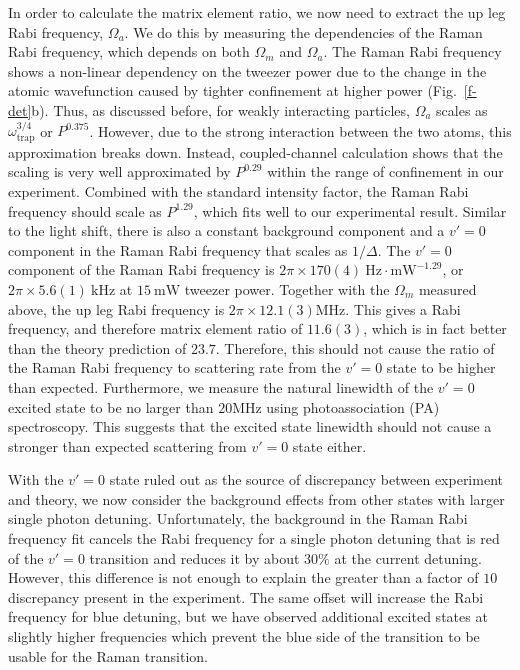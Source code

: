 \documentclass[aps,prl,twocolumn,superscriptaddress]{revtex4-1}
\begin{document}
In order to calculate the matrix element ratio,
we now need to extract the up leg Rabi frequency, $ \Omega_a $.
We do this by measuring the dependencies of the Raman Rabi frequency,
which depends on both $\Omega_m$ and $\Omega_a$.
The Raman Rabi frequency shows a non-linear dependency on the tweezer power
due to the change in the atomic wavefunction caused by
tighter confinement at higher power (Fig.~\ref{f-det}b).
Thus, as discussed before, for weakly interacting particles,
$\Omega_a$ scales as $ \omega_{\text{trap}}^{3/4}$ or $P^{0.375}$.
However, due to the strong interaction between the two atoms, this approximation breaks down.
Instead, coupled-channel calculation shows that the scaling
is very well approximated by $P^{0.29}$ within the range of confinement in our experiment.
Combined with the standard intensity factor, the Raman Rabi frequency should scale as $P^{1.29}$,
which fits well to our experimental result.
Similar to the light shift, there is also a constant background component
and a $v'=0$ component in the Raman Rabi frequency that scales as $1/\Delta$.
The $v'=0$ component of the Raman Rabi frequency is
$2\pi\times170(4) ~\mathrm{Hz\cdot mW^{-1.29}}$,
or $2\pi \times 5.6(1)~\mathrm{kHz}$ at $15 ~\mathrm{mW}$ tweezer power.
Together with the $\Omega_m$ measured above, the up leg Rabi frequency is
$2\pi \times 12.1(3)\mathrm{MHz}$.
This gives a Rabi frequency, and therefore matrix element ratio of $11.6(3)$,
which is in fact better than the theory prediction of $23.7$.
Therefore, this should not cause the ratio of the Raman Rabi frequency to scattering rate
from the $v'=0$ state to be higher than expected.
Furthermore, we measure the natural linewidth of the $v'=0$ excited state to be no larger than $20 \mathrm{MHz}$ using photoassociation (PA) spectroscopy.
This suggests that the excited state linewidth should not cause
a stronger than expected scattering from $v'=0$ state either.

With the $ v' = 0 $ state ruled out as the source of discrepancy between experiment and theory,
we now consider the background effects from other states with larger single photon detuning.
Unfortunately, the background in the Raman Rabi frequency fit cancels the Rabi frequency
for a single photon detuning that is red of the $v' = 0$ transition
and reduces it by about $30\%$ at the current detuning.
However, this difference is not enough to explain the greater than a factor of $10$ discrepancy
present in the experiment.
The same offset will increase the Rabi frequency for blue detuning,
but we have observed additional excited states at slightly higher frequencies
which prevent the blue side of the transition to be usable for the Raman transition.
\end{document}
